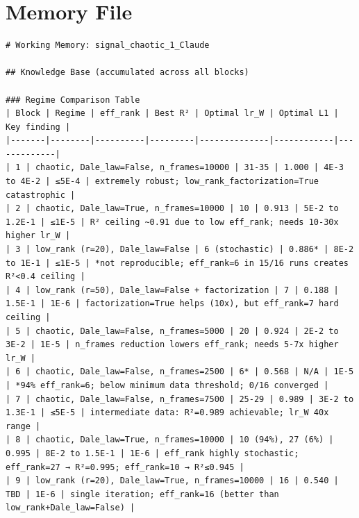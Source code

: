 \documentclass[10pt,twocolumn]{article}
\begin{document}
\section{Memory File}
\label{app:memory}

\begin{small}
\begin{verbatim}
# Working Memory: signal_chaotic_1_Claude

## Knowledge Base (accumulated across all blocks)

### Regime Comparison Table
| Block | Regime | eff_rank | Best R² | Optimal lr_W | Optimal L1 | Key finding |
|-------|--------|----------|---------|--------------|------------|-------------|
| 1 | chaotic, Dale_law=False, n_frames=10000 | 31-35 | 1.000 | 4E-3 to 4E-2 | ≤5E-4 | extremely robust; low_rank_factorization=True catastrophic |
| 2 | chaotic, Dale_law=True, n_frames=10000 | 10 | 0.913 | 5E-2 to 1.2E-1 | ≤1E-5 | R² ceiling ~0.91 due to low eff_rank; needs 10-30x higher lr_W |
| 3 | low_rank (r=20), Dale_law=False | 6 (stochastic) | 0.886* | 8E-2 to 1E-1 | ≤1E-5 | *not reproducible; eff_rank=6 in 15/16 runs creates R²<0.4 ceiling |
| 4 | low_rank (r=50), Dale_law=False + factorization | 7 | 0.188 | 1.5E-1 | 1E-6 | factorization=True helps (10x), but eff_rank=7 hard ceiling |
| 5 | chaotic, Dale_law=False, n_frames=5000 | 20 | 0.924 | 2E-2 to 3E-2 | 1E-5 | n_frames reduction lowers eff_rank; needs 5-7x higher lr_W |
| 6 | chaotic, Dale_law=False, n_frames=2500 | 6* | 0.568 | N/A | 1E-5 | *94% eff_rank=6; below minimum data threshold; 0/16 converged |
| 7 | chaotic, Dale_law=False, n_frames=7500 | 25-29 | 0.989 | 3E-2 to 1.3E-1 | ≤5E-5 | intermediate data: R²=0.989 achievable; lr_W 40x range |
| 8 | chaotic, Dale_law=True, n_frames=10000 | 10 (94%), 27 (6%) | 0.995 | 8E-2 to 1.5E-1 | 1E-6 | eff_rank highly stochastic; eff_rank=27 → R²=0.995; eff_rank=10 → R²≤0.945 |
| 9 | low_rank (r=20), Dale_law=True, n_frames=10000 | 16 | 0.540 | TBD | 1E-6 | single iteration; eff_rank=16 (better than low_rank+Dale_law=False) |


\end{verbatim}
\end{small}
\end{document}
